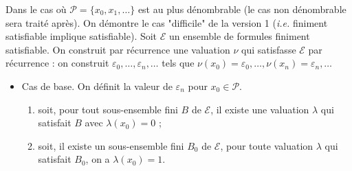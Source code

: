 \documentclass[./main]{subfiles}
\begin{document}
  \begin{prv}
    Dans le cas où $\mathcal{P} = \{x_0, x_1, \ldots\} $ est au plus dénombrable (le cas non dénombrable sera traité après).
    On démontre le cas "difficile" de la version 1 (\textit{i.e.} finiment satisfiable implique satisfiable).
    Soit $\mathcal{E}$ un ensemble de formules finiment satisfiable.
    On construit par récurrence une valuation $\nu$ qui satisfasse  $\mathcal{E}$ par récurrence : on construit $\varepsilon_0, \ldots, \varepsilon_n, \ldots$ tels que $\nu(x_0) = \varepsilon_0, \ldots, \nu(x_n) = \varepsilon_n, \ldots$
    \begin{itemize}
      \item Cas de base.
        On définit la valeur de $\varepsilon_n$ pour $x_0 \in \mathcal{P}$.
        \begin{enumerate}
          \item soit, pour tout sous-ensemble fini $B$ de $\mathcal{E}$, il existe une valuation $\lambda$ qui satisfait $B$ avec $\lambda(x_0) = 0$ ; \label{chap1-comp-cas1}
          \item soit, il existe un sous-ensemble fini $B_0$ de $\mathcal{E}$, pour toute valuation $\lambda$ qui satisfait $B_0$, on a $\lambda(x_0) = 1$.  \label{chap1-comp-cas2}
        \end{enumerate}


\end{itemize}
\end{prv}
\end{document}

